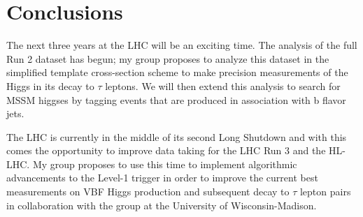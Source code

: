 \documentclass[preprint,12pt]{elsarticle}
\begin{document}
\section{Conclusions}
The next three years at the LHC will be an exciting time. 
The analysis of the full Run 2 dataset has begun; my group proposes to analyze this
dataset in the simplified template cross-section scheme to make precision measurements 
of the Higgs in its decay to $\tau$ leptons.
We will then extend this analysis to search for MSSM higgses by tagging events that are
produced in association with b flavor jets.

The LHC is currently in the middle of its second 
Long Shutdown and with this comes the opportunity to improve data taking for the LHC 
Run 3 and the HL-LHC. 
My group proposes to use this time to implement algorithmic advancements to the Level-1 
trigger in order to improve the current best measurements on VBF Higgs production and 
subsequent decay to $\tau$ lepton pairs in collaboration with the
group at the University of Wisconsin-Madison.


\newpage




%

%
\printbibliography






\end{document}

